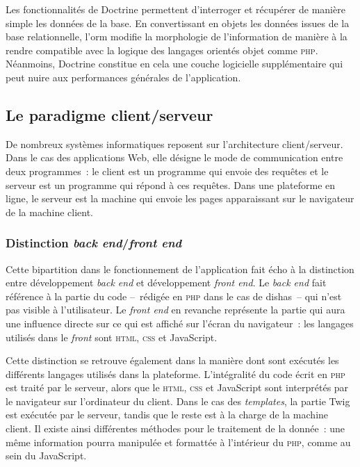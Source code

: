\documentclass[a4paper,12pt,twoside]{book}
\newcommand{\eng}{\emph}
\newcommand{\html}{\textsc{html}\xspace}
\newcommand{\php}{\textsc{php}\xspace}
\newcommand{\css}{\textsc{css}\xspace}
\newcommand{\dishas}{\gls{dishas}\xspace}
\newcommand{\orm}{\gls{orm}\xspace}
\begin{document}
Les fonctionnalités de Doctrine permettent d'interroger et récupérer de manière simple les données de la base. En convertissant en objets les données issues de la base relationnelle, l'\orm modifie la morphologie de l'information de manière à la rendre compatible avec la logique des langages orientés objet comme \php. Néanmoins, Doctrine constitue en cela une couche logicielle supplémentaire qui peut nuire aux performances générales de l'application.

		\subsection{Le paradigme client/serveur}
De nombreux systèmes informatiques reposent sur l'architecture client/serveur. Dans le cas des applications Web, elle désigne le mode de communication entre deux programmes~: le client est un programme qui envoie des requêtes et le serveur est un programme qui répond à ces requêtes. Dans une plateforme en ligne, le serveur est la machine qui envoie les pages apparaissant sur le navigateur de la machine client.

			\subsubsection{Distinction \eng{back end}/\eng{front end}}
Cette bipartition dans le fonctionnement de l'application fait écho à la distinction entre développement \eng{back end} et développement \eng{front end}. Le \eng{back end} fait référence à la partie du code –~rédigée en \php dans le cas de \dishas~– qui n'est pas visible à l'utilisateur. Le \eng{front end} en revanche représente la partie qui aura une influence directe sur ce qui est affiché sur l'écran du navigateur~: les langages utilisés dans le \eng{front} sont \html, \css et JavaScript.

Cette distinction se retrouve également dans la manière dont sont exécutés les différents langages utilisés dans la plateforme. L'intégralité du code écrit en \php est traité par le serveur, alors que le \html, \css et JavaScript sont interprétés par le navigateur sur l'ordinateur du client. Dans le cas des \eng{templates}, la partie Twig est exécutée par le serveur, tandis que le reste est à la charge de la machine client. Il existe ainsi différentes méthodes pour le traitement de la donnée~: une même information pourra manipulée et formattée à l'intérieur du \php, comme au sein du JavaScript.
\end{document}
